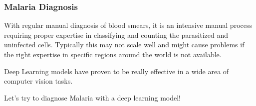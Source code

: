 \begin{frame}[fragile]
  \frametitle{Malaria Diagnosis}
  With regular manual diagnosis of blood smears, it is an intensive manual process requiring proper expertise in classifying and counting the parasitized and uninfected cells. Typically this may not scale well and might cause problems if the right expertise in specific regions around the world is not available.\\

  \vspace{3mm}

  Deep Learning models have proven to be really effective in a wide area of computer vision tasks.\\

  \vspace{3mm}

  Let's try to diagnose Malaria with a deep learning model!
  \end{frame}
